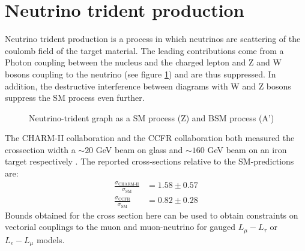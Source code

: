 \section{Neutrino trident production} 
Neutrino trident production is a process in which neutrinos are scattering of the coulomb field of the target material. The leading contributions come from a Photon coupling between the nucleus and the charged lepton and Z and W bosons coupling to the neutrino (see figure \ref{fg:trident}) and are thus suppressed. In addition, the destructive interference between diagrams with W and Z bosons suppress the SM process even further. 
\begin{figure}[H]
\centering
{}
\caption{Neutrino-trident graph as a SM process (Z) and BSM process (A')}
\label{fg:trident}
\end{figure}
The CHARM-II collaboration and the CCFR collaboration both measured the crossection width a $\sim 20$ GeV beam on glass and $\sim 160$ GeV beam on an iron target respectively \cite{Altmannshofer:2014pba}.
The reported cross-sections relative to the SM-predictions are:
\begin{align*}
\frac{\sigma_\text{CHARM-II}}{\sigma_\text{SM}}&=1.58\pm 0.57\\
\frac{\sigma_\text{CCFR}}{\sigma_\text{SM}}&=0.82\pm0.28
\end{align*}
Bounds obtained for the cross section here can be used to obtain constraints on vectorial couplings to the muon and muon-neutrino for gauged $L_\mu-L_\tau$ or $L_e-L_\mu$ models. 
